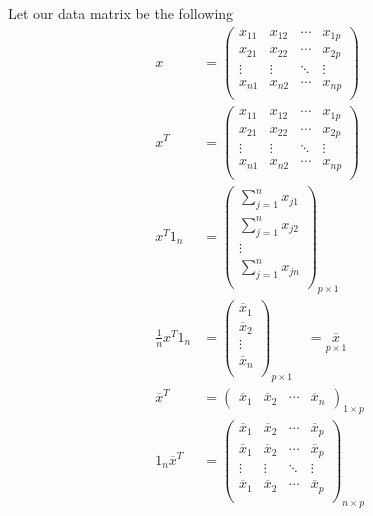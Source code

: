 Let our data matrix be the following
\begin{align*}
    x &= 
    \begin{pmatrix}
    x_{11} & x_{12} & \cdots & x_{1p} \\
    x_{21} & x_{22} & \cdots & x_{2p} \\
    \vdots & \vdots & \ddots & \vdots \\
    x_{n1} & x_{n2} & \cdots & x_{np} \\ \end{pmatrix} \\
    x^T &= 
    \begin{pmatrix}
    x_{11} & x_{12} & \cdots & x_{1p} \\
    x_{21} & x_{22} & \cdots & x_{2p} \\
    \vdots & \vdots & \ddots & \vdots \\
    x_{n1} & x_{n2} & \cdots & x_{np} \\ \end{pmatrix} \\
    x^T1_n &= 
    \begin{pmatrix}
    \displaystyle\sum_{j=1}^n x_{j1}\\
    \displaystyle\sum_{j=1}^n x_{j2}\\
    \vdots \\
    \displaystyle\sum_{j=1}^n x_{jn}\\
    \end{pmatrix}_{p\times 1} \\
    \frac{1}{n}x^T1_n &= 
    \begin{pmatrix}
    \overline{x}_1\\
    \overline{x}_2\\
    \vdots\\
    \overline{x}_n\\
    \end{pmatrix}_{p\times 1} \quad= \underset{p\times 1}{\overline{x}} \\
    \overline{x}^T &=\begin{pmatrix}
    \overline{x}_1&
    \overline{x}_2&
    \cdots&
    \overline{x}_n
    \end{pmatrix}_{1\times p} \\
    1_n\overline{x}^T &= \begin{pmatrix}
    \overline{x}_1 & \overline{x}_2 & \cdots & \overline{x}_p \\
    \overline{x}_1 & \overline{x}_2 & \cdots & \overline{x}_p \\
    \vdots & \vdots & \ddots & \vdots \\
    \overline{x}_1 & \overline{x}_2 & \cdots & \overline{x}_p \\ \end{pmatrix}_{n\times p}
\end{align*}

